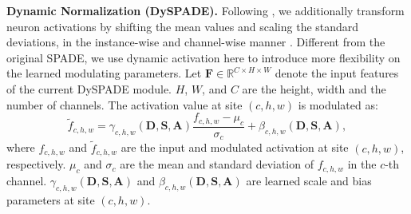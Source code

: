 \documentclass[10pt,twocolumn,letterpaper]{article}
\begin{document}
\textbf{Dynamic Normalization (DySPADE).}
Following \cite{Park2019GauGAN}, we additionally transform neuron activations by shifting the mean values and scaling the standard deviations, in the instance-wise and channel-wise manner \cite{ulyanov2017IN}.  Different from the original SPADE, we use dynamic activation here to introduce more flexibility on the learned modulating parameters.
Let $\mathbf{F} \in \mathbb{R}^{C \times H \times W}$ denote the input features of the current DySPADE module. $H$, $W$, and $C$ are the height, width and the number of channels. The activation value at site $(c,h,w)$ is modulated as: 
\begin{equation}
	\tilde{f}_{c,h,w} = \gamma_{c,h,w}(\mathbf{D}, \mathbf{S},\mathbf{A}) \frac{f_{c,h,w}-\mu_{c}}{\sigma_{c}} + \beta_{c,h,w}(\mathbf{D}, \mathbf{S},\mathbf{A}),
	\label{eq:DySPADE}
\end{equation}
where $f_{c,h,w}$ and $\tilde{f}_{c,h,w}$ are the input and modulated activation at site $(c, h, w)$, respectively. $\mu_{c}$ and $\sigma_{c}$ are the mean and standard deviation of $f_{c,h,w}$ in the $c$-th channel. 
$\gamma_{c,h,w}(\mathbf{D}, \mathbf{S},\mathbf{A})$ and $\beta_{c,h,w}(\mathbf{D}, \mathbf{S},\mathbf{A})$ are learned scale and bias parameters at site $(c,h,w)$. 
\end{document}
